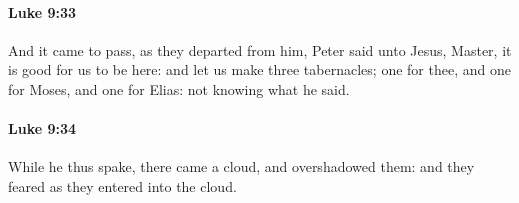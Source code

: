 		\paragraph{Luke 9:33} %
			\label{LUKE-9-33}

			And it came to pass, as they departed from him, Peter said unto Jesus, Master, it is good for us to be here: and let us make three tabernacles; one for thee, and one for Moses, and one for Elias: not knowing what he said.

			\begin{framed}
			\scriptsize
				\begin{compactdesc}
					\item[SBLG] 
				\end{compactdesc}
			\end{framed}

		\paragraph{Luke 9:34} %
			\label{LUKE-9-34}

			While he thus spake, there came a cloud, and overshadowed them: and they feared as they entered into the cloud.

